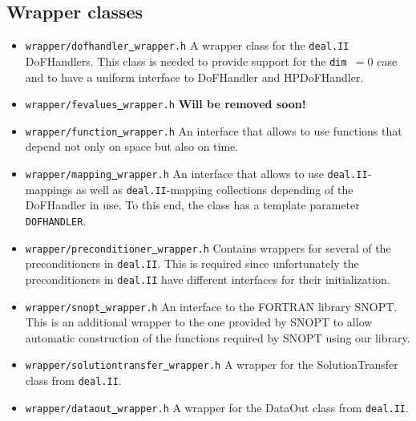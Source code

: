 \subsection{Wrapper classes}
\begin{itemize}
  \item \texttt{wrapper/dofhandler\underline{ }wrapper.h} A wrapper class for the \texttt{deal.II} DoFHandlers. This 
    class is needed to provide support for the \texttt{dim $= 0$} case and to have a uniform interface to 
    DoFHandler and HPDoFHandler.
  \item \texttt{wrapper/fevalues\underline{ }wrapper.h} {\bf Will be removed soon!}
  \item \texttt{wrapper/function\underline{ }wrapper.h} An interface that allows to use functions that depend 
    not only on space but also on time.
  \item \texttt{wrapper/mapping\underline{ }wrapper.h} An interface that allows to use \texttt{deal.II}-mappings as well as  \texttt{deal.II}-mapping collections depending of the DoFHandler in use. To this end, the class has a template parameter \texttt{DOFHANDLER}.
  \item \texttt{wrapper/preconditioner\underline{ }wrapper.h} Contains wrappers for several of the preconditioners
    in \texttt{deal.II}. This is required since unfortunately the preconditioners in \texttt{deal.II} have different
    interfaces for their initialization.
  \item \texttt{wrapper/snopt\underline{ }wrapper.h} An interface to the FORTRAN library SNOPT. 
    This is an additional
    wrapper to the one provided by SNOPT to allow automatic construction of the functions required 
    by SNOPT using our library.
  \item \texttt{wrapper/solutiontransfer\underline{ }wrapper.h} A wrapper for the SolutionTransfer class
    from \texttt{deal.II}. 
  \item \texttt{wrapper/dataout\underline{ }wrapper.h} A wrapper for the DataOut class from \texttt{deal.II}.
\end{itemize}


